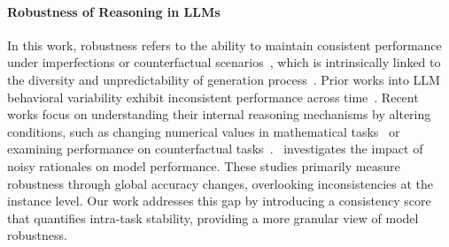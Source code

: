 \paragraph{Robustness of Reasoning in LLMs}
In this work, robustness refers to the ability to maintain consistent performance under imperfections or counterfactual scenarios~\cite{elazar-etal-2021-measuring}, which is intrinsically linked to the diversity and unpredictability of generation process~\cite{zhang2023sirenssongaiocean,huang2025hallu}. Prior works into LLM behavioral variability exhibit inconsistent performance across time~\cite{tu2024chatlogcarefullyevaluatingevolution,chen2023chatgptsbehaviorchangingtime}. Recent works focus on understanding their internal reasoning mechanisms by altering conditions, such as changing numerical values in mathematical tasks~\cite{mirzadeh2024gsmsymbolicunderstandinglimitationsmathematical,huang2025mathperturbbenchmarkingllmsmath} or examining performance on counterfactual tasks~\cite{wu-etal-2024-reasoning}.~\citet{zhou2024can} investigates the impact of noisy rationales on model performance. These studies primarily measure robustness through global accuracy changes, overlooking inconsistencies at the instance level. Our work addresses this gap by introducing a consistency score that quantifies intra-task stability, providing a more granular view of model robustness.